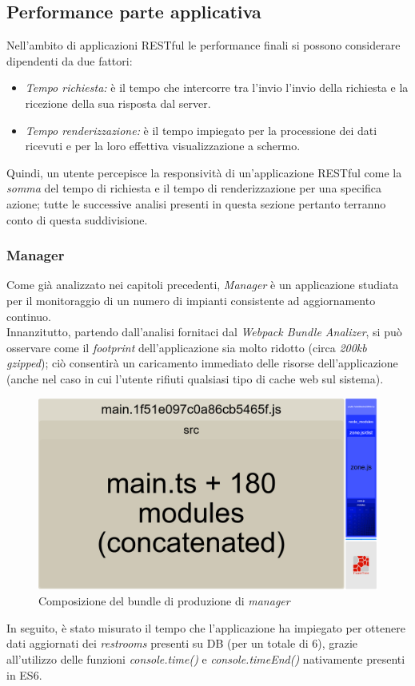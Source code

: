 \documentclass[12pt]{article}
\begin{document}
\subsection{Performance parte applicativa}
Nell'ambito di applicazioni RESTful le performance finali si possono considerare dipendenti da due fattori:
\begin{itemize}
\item \textit{Tempo richiesta:} è il tempo che intercorre tra l'invio l'invio della richiesta e la ricezione della sua risposta dal server.
\item \textit{Tempo renderizzazione:} è il tempo impiegato per la processione dei dati ricevuti e per la loro effettiva visualizzazione a schermo.
\end{itemize}
Quindi, un utente percepisce la responsività di un'applicazione RESTful come la \textit{somma} del tempo di richiesta e il tempo di renderizzazione per una specifica azione; tutte le successive analisi presenti in questa sezione pertanto terranno conto di questa suddivisione.
\subsubsection{Manager}
Come già analizzato nei capitoli precedenti, \textit{Manager} è un applicazione studiata per il monitoraggio di un numero di impianti consistente ad aggiornamento continuo.\\
Innanzitutto, partendo dall'analisi fornitaci dal \textit{Webpack Bundle Analizer}\cite{bundleAnalyzer}, si può osservare come il \textit{footprint} dell'applicazione sia molto ridotto (circa \textit{200kb gzipped}); ciò consentirà un caricamento immediato delle risorse dell'applicazione (anche nel caso in cui l'utente rifiuti qualsiasi tipo di cache web sul sistema).
\begin{figure}[h!]
\centering
  \includegraphics[scale=0.18]{img/footprint-manager.png}
  \caption{Composizione del bundle di produzione di \textit{manager}}
\end{figure}
\newpage
In seguito, è stato misurato il tempo che l'applicazione ha impiegato per ottenere dati aggiornati dei \textit{restrooms} presenti su DB (per un totale di 6), grazie all'utilizzo delle funzioni \textit{console.time()} e \textit{console.timeEnd()} nativamente presenti in ES6.
\end{document}
